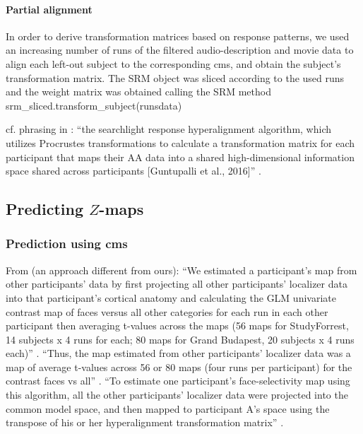 \paragraph{Partial alignment}

%



%
In order to derive transformation matrices based on response patterns,
we used an increasing number of runs of the filtered audio-description and movie
data to align each left-out subject to the corresponding \ac{cms}, and obtain
the subject's transformation matrix.
%
The SRM object was sliced according to the used runs and the weight matrix was
obtained calling the SRM method srm\_sliced.transform\_subject(runsdata)

%
cf. phrasing in \citep{busch2021hybrid}: ``the searchlight response
hyperalignment algorithm, which utilizes Procrustes transformations to calculate
a transformation matrix for each participant that maps their AA data into a
shared high-dimensional information space shared across participants [Guntupalli
et al., 2016]'' \citep{busch2021hybrid}.


\subsection{Predicting $Z$-maps}


\subsubsection{Prediction using \ac{cms}}
%
From \citep{jiahui2020predicting} (an approach different from ours): ``We
estimated a participant's map from other participants' data by first projecting
all other participants' localizer data into that participant's cortical anatomy
and calculating the GLM univariate contrast map of faces versus all other
categories for each run in each other participant then averaging t-values across
the maps (56 maps for StudyForrest, 14 subjects x 4 runs for each; 80 maps for
Grand Budapest, 20 subjects x 4 runs each)'' \citep{jiahui2020predicting}.
%
``Thus, the map estimated from other participants' localizer data was a map of
average t-values across 56 or 80 maps (four runs per participant) for the
contrast faces vs all'' \citep{jiahui2020predicting}.
%
``To estimate one participant's face-selectivity map using this algorithm, all
the other participants' localizer data were projected into the common model
space, and then mapped to participant A's space using the transpose of his or
her hyperalignment transformation matrix'' \citep{jiahui2020predicting}.


